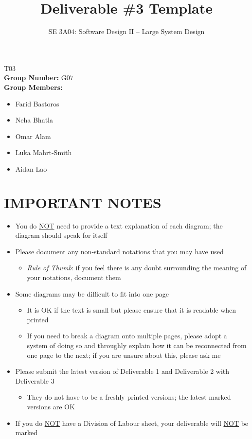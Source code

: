 \documentclass[]{article}
\title{Deliverable \#3 Template}
\author{SE 3A04: Software Design II -- Large System Design}
\date{}
\begin{document}
\setlength{\parindent}{0pt}

\maketitle	
{} T03\\
{\bf Group Number:} G07 \\
{\bf Group Members:} 
\begin{itemize}
	\item Farid Bastoros 
	\item Neha Bhatla
	\item Omar Alam
	\item Luka Mahrt-Smith
	\item Aidan Lao
\end{itemize}

\section*{IMPORTANT NOTES}
\begin{itemize}
	\item You do \underline{NOT} need to provide a text explanation of each diagram; the diagram should speak for itself
	\item Please document any non-standard notations that you may have used
	\begin{itemize}
		\item \emph{Rule of Thumb}: if you feel there is any doubt surrounding the meaning of your notations, document them
	\end{itemize}
	\item Some diagrams may be difficult to fit into one page
	\begin{itemize}
		\item It is OK if the text is small but please ensure that it is readable when printed
		\item If you need to break a diagram onto multiple pages, please adopt a system of doing so and throughly explain how it can be reconnected from one page to the next; if you are unsure about this, please ask me
	\end{itemize}
	\item Please submit the latest version of Deliverable 1 and Deliverable 2 with Deliverable 3
	\begin{itemize}
		\item They do not have to be a freshly printed versions; the latest marked versions are OK
	\end{itemize}
	\item If you do \underline{NOT} have a Division of Labour sheet, your deliverable will \underline{NOT} be marked
\end{itemize}
\maketitle	
\clearpage
\end{document}
